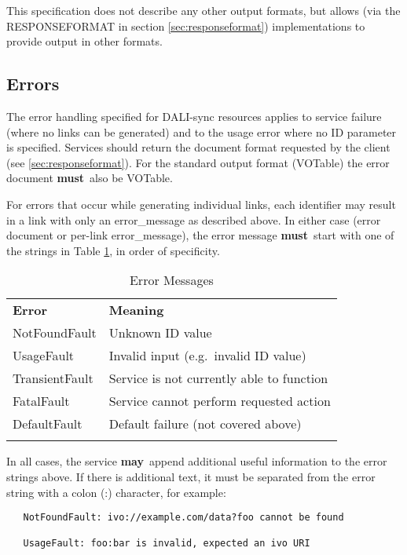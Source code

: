 \documentclass[11pt,a4paper]{ivoa}
\newcommand{\rfcmust}{\textbf{must}}
\newcommand{\rfcmay}{\textbf{may}}
\begin{document}
This specification does not describe any other output formats, but allows
(via the RESPONSEFORMAT in section \ref{sec:responseformat})
implementations to provide
output in other formats.


\subsection{Errors}

The error handling specified for DALI-sync resources applies
to service failure (where no links can be generated) and to the usage
error where no ID parameter is specified. Services should return the
document format requested by the client (see \ref{sec:responseformat}).
For the standard
output format (VOTable) the error document \rfcmust\ also be VOTable.

For errors that occur while generating individual links, each
identifier may result in a link with only an error\_message
as described above.
In either case (error document or per-link error\_message),
the error message \rfcmust\ start with one of the strings in
Table \ref{tab:errors}, in order of specificity.
\begin{table}[ht]
\begin{center}
\begin{tabular}{|l|l|}
\sptablerule
{\bf Error} & {\bf Meaning} \\
\sptablerule
NotFoundFault  & Unknown ID value    \\
UsageFault     & Invalid input (e.g.\ invalid ID value) \\
TransientFault & Service is not currently able to function \\
FatalFault     & Service cannot perform requested action \\
DefaultFault   & Default failure (not covered above) \\
\sptablerule
\end{tabular}
\end{center}
\caption{Error Messages}
\label{tab:errors}
\end{table}

In all cases, the service \rfcmay\ append additional useful information to the
error strings above.
If there is additional text, it must be separated
from the error string with a colon (:) character, for example:
\begin{verbatim}
   NotFoundFault: ivo://example.com/data?foo cannot be found

   UsageFault: foo:bar is invalid, expected an ivo URI 
\end{verbatim}
\end{document}
